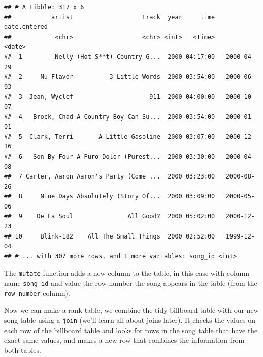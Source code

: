 \documentclass[12pt,]{book}
\newenvironment{Shaded}{\begin{snugshade}}{\end{snugshade}}
\newcommand{\KeywordTok}[1]{\textcolor[rgb]{0.13,0.29,0.53}{\textbf{#1}}}
\newcommand{\StringTok}[1]{\textcolor[rgb]{0.31,0.60,0.02}{#1}}
\newcommand{\OperatorTok}[1]{\textcolor[rgb]{0.81,0.36,0.00}{\textbf{#1}}}
\newcommand{\NormalTok}[1]{#1}
\theoremstyle{definition}
\theoremstyle{definition}
\theoremstyle{remark}
\begin{document}
\begin{verbatim}
## # A tibble: 317 x 6
##           artist                   track  year     time date.entered
##            <chr>                   <chr> <int>   <time>       <date>
##  1         Nelly (Hot S**t) Country G...  2000 04:17:00   2000-04-29
##  2     Nu Flavor          3 Little Words  2000 03:54:00   2000-06-03
##  3  Jean, Wyclef                     911  2000 04:00:00   2000-10-07
##  4   Brock, Chad A Country Boy Can Su...  2000 03:54:00   2000-01-01
##  5  Clark, Terri       A Little Gasoline  2000 03:07:00   2000-12-16
##  6   Son By Four A Puro Dolor (Purest...  2000 03:30:00   2000-04-08
##  7 Carter, Aaron Aaron's Party (Come ...  2000 03:23:00   2000-08-26
##  8     Nine Days Absolutely (Story Of...  2000 03:09:00   2000-05-06
##  9    De La Soul               All Good?  2000 05:02:00   2000-12-23
## 10     Blink-182    All The Small Things  2000 02:52:00   1999-12-04
## # ... with 307 more rows, and 1 more variables: song_id <int>
\end{verbatim}

The \texttt{mutate} function adds a new column to the table, in this
case with column name \texttt{song\_id} and value the row number the
song appears in the table (from the \texttt{row\_number} column).

Now we can make a rank table, we combine the tidy billboard table with
our new song table using a \texttt{join} (we'll learn all about joins
later). It checks the values on each row of the billboard table and
looks for rows in the song table that have the exact same values, and
makes a new row that combines the information from both tables.

\begin{Shaded}
\end{Shaded}
\end{document}

